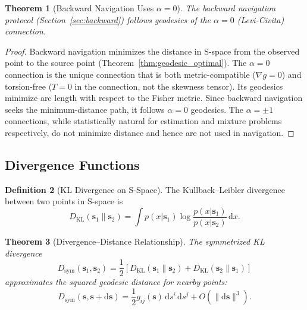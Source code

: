\documentclass[11pt,twocolumn,a4paper]{article}
\newtheorem{theorem}{Theorem}[section]
\theoremstyle{definition}
\newtheorem{definition}[theorem]{Definition}
\newcommand{\dif}{\mathrm{d}}
\begin{document}
\begin{theorem}[Backward Navigation Uses $\alpha = 0$]\label{thm:nav_alpha0}
The backward navigation protocol (Section~\ref{sec:backward}) follows geodesics of the
$\alpha = 0$ (Levi-Civita) connection.
\end{theorem}

\begin{proof}
Backward navigation minimizes the distance in S-space from the observed point to the
source point (Theorem~\ref{thm:geodesic_optimal}). The $\alpha = 0$ connection is the
unique connection that is both metric-compatible ($\nabla g = 0$) and torsion-free
($T = 0$ in the connection, not the skewness tensor). Its geodesics minimize arc length
with respect to the Fisher metric. Since backward navigation seeks the minimum-distance
path, it follows $\alpha = 0$ geodesics. The $\alpha = \pm 1$ connections, while
statistically natural for estimation and mixture problems respectively, do not minimize
distance and hence are not used in navigation.
\end{proof}

\subsection{Divergence Functions}\label{sec:infogeo:divergence}

\begin{definition}[KL Divergence on S-Space]\label{def:kl_divergence}
The Kullback--Leibler divergence~\cite{kullback1951} between two points in S-space is
\begin{equation}\label{eq:kl_divergence}
  D_{\mathrm{KL}}(\mathbf{s}_1 \| \mathbf{s}_2) = \int p(x|\mathbf{s}_1)
  \log \frac{p(x|\mathbf{s}_1)}{p(x|\mathbf{s}_2)} \, \dif x.
\end{equation}
\end{definition}

\begin{theorem}[Divergence--Distance Relationship]\label{thm:div_distance}
The symmetrized KL divergence
\begin{equation}\label{eq:sym_kl}
  D_{\mathrm{sym}}(\mathbf{s}_1, \mathbf{s}_2)
  = \frac{1}{2}\left[D_{\mathrm{KL}}(\mathbf{s}_1 \| \mathbf{s}_2)
  + D_{\mathrm{KL}}(\mathbf{s}_2 \| \mathbf{s}_1)\right]
\end{equation}
approximates the squared geodesic distance for nearby points:
\begin{equation}\label{eq:div_approx}
  D_{\mathrm{sym}}(\mathbf{s}, \mathbf{s} + \dif\mathbf{s})
  = \frac{1}{2} g_{ij}(\mathbf{s}) \, \dif s^i \, \dif s^j + O(\|\dif\mathbf{s}\|^3).
\end{equation}
\end{theorem}
\end{document}
